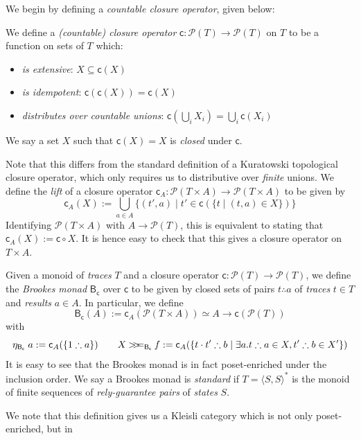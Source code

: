 \documentclass[acmsmall,screen,anonymous,review]{acmart}
\newcommand{\mc}[1]{\ensuremath{\mathcal{#1}}}
\newcommand{\ms}[1]{\ensuremath{\mathsf{#1}}}
\newcommand{\obind}{\mathbin{>\!\!>\mkern-6.7mu=}}
\newcommand{\mbind}[3]{#2 \obind_{#1} #3}
\newcommand{\tret}[2]{#1 \therefore #2}
\begin{document}
We begin by defining a \emph{countable closure operator}, given below:
\begin{definition}
  We define a \emph{(countable) closure operator} $\ms{c}: \mc{P}(T) \to \mc{P}(T)$ on $T$ to be a
  function on sets of $T$ which:
  \begin{itemize}
    \item \emph{is extensive}: $X \subseteq \ms{c}(X)$
    \item \emph{is idempotent}: $\ms{c}(\ms{c}(X)) = \ms{c}(X)$
    \item \emph{distributes over countable unions}: $\ms{c}(\bigcup_i X_i) = \bigcup_i \ms{c}(X_i)$
  \end{itemize}
  We say a set $X$ such that $\ms{c}(X) = X$ is \emph{closed} under $\ms{c}$. 
\end{definition}
Note that this differs from the standard definition of a Kuratowski topological closure operator,
which only requires us to distributive over \emph{finite} unions. We define the \emph{lift} of a
closure operator $\ms{c}_A : \mc{P}(T \times A) \to \mc{P}(T \times A)$ to be given by
\begin{equation*}
  \ms{c}_A(X) := \bigcup_{a \in A}\{(t', a) \mid t' \in \ms{c}(\{t \mid (t, a) \in X\})\}
\end{equation*}
Identifying $\mc{P}(T \times A)$ with $A \to \mc{P}(T)$, this is equivalent to stating that
$\ms{c}_A(X) := \ms{c} \circ X$. It is hence easy to check that this gives a closure operator on $T
\times A$.
\begin{definition}
  Given a monoid of \emph{traces} $T$ and a closure operator $\ms{c}: \mc{P}(T) \to \mc{P}(T)$, we
  define the \emph{Brookes monad} $\ms{B}_{\ms{c}}$ over $\ms{c}$ to be given by closed sets of
  pairs $\tret{t}{a}$ of \emph{traces} $t \in T$ and \emph{results} $a \in A$. In particular, we
  define
  $$
  \ms{B}_{\ms{c}}(A) := \ms{c}_A(\mc{P}(T \times A)) \simeq A \to \ms{c}(\mc{P}(T))
  $$
  with
  $$
  \eta_{\ms{B}_{\ms{c}}}\;a := \ms{c}_A(\{\tret{1}{a}\}) \qquad
  \mbind{\ms{B}_{\ms{c}}}{X}{f} 
  := \ms{c}_A(\{\tret{t \cdot t'}{b} \mid \exists a . \tret{t}{a} \in X, \tret{t'}{b} \in X'\})
  $$
  It is easy to see that the Brookes monad is in fact poset-enriched under the inclusion order. We
  say a Brookes monad is \emph{standard} if $T = \langle S, S \rangle^*$ is the monoid of finite
  sequences of \emph{rely-guarantee pairs} of \emph{states} $S$.
\end{definition}
We note that this definition gives us a Kleisli category which is not only poset-enriched, but in
\end{document}
